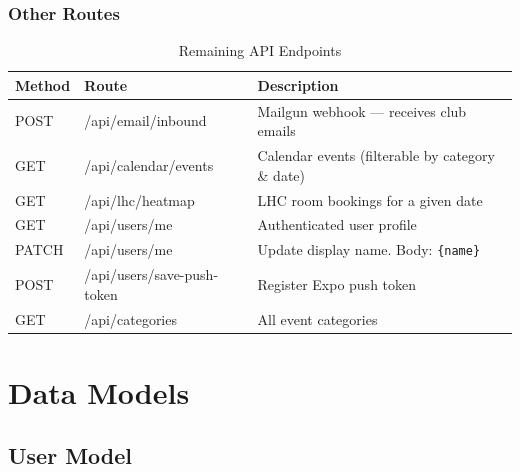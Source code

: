 \documentclass[12pt,a4paper]{report}
\begin{document}
\subsection{Other Routes}

\begin{table}[H]
\centering
{}
\begin{tabularx}{\textwidth}{>{\ttfamily}l >{\ttfamily}l X}
\rowcolor{tableheadbg}
\color{white}\normalfont Method & \color{white}\normalfont Route & \color{white}\normalfont Description \\
\toprule
POST  & /api/email/inbound          & Mailgun webhook — receives club emails          \\
GET   & /api/calendar/events        & Calendar events (filterable by category \& date) \\
GET   & /api/lhc/heatmap            & LHC room bookings for a given date              \\
GET   & /api/users/me               & Authenticated user profile                      \\
PATCH & /api/users/me               & Update display name. Body: \texttt{\{name\}}    \\
POST  & /api/users/save-push-token  & Register Expo push token                        \\
GET   & /api/categories             & All event categories                            \\
\bottomrule
\end{tabularx}
\caption{Remaining API Endpoints}
\end{table}

\chapter{Data Models}

\section{User Model}
\end{document}
